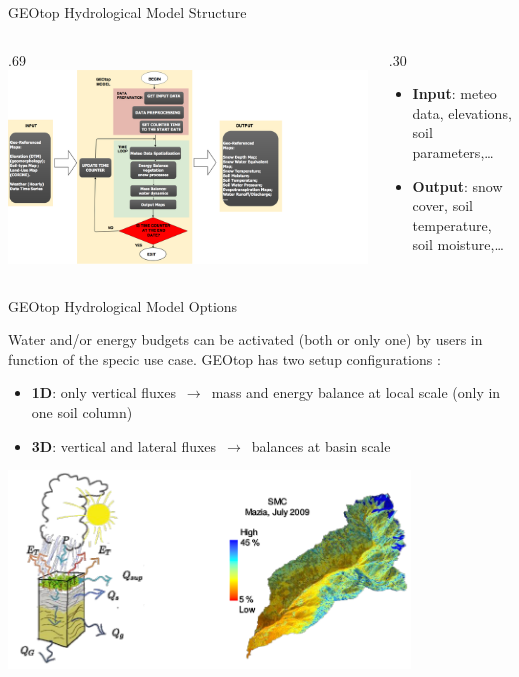 \documentclass[ignorenonframetext,]{beamer}
\def\begincols{\begin{columns}}
\def\begincol{\begin{column}}
\def\endcol{\end{column}}
\def\endcols{\end{columns}}
\begin{document}
\begin{frame}{GEOtop Hydrological Model Structure}

\begincols

\begincol{.69\textwidth}
\includegraphics[width=1.00000\textwidth]{resources/images/geotop_revised.png}\\
\endcol

\begincol{.30\textwidth}

\begin{itemize}
\item
  \textbf{Input}: meteo data, elevations, soil parameters,\ldots{}
\item
  \textbf{Output}: snow cover, soil temperature, soil moisture,\ldots{}
\end{itemize}

\endcol
\endcols

\end{frame}

\begin{frame}{GEOtop Hydrological Model Options}

Water and/or energy budgets can be activated (both or only one) by users
in function of the specic use case. GEOtop has two setup configurations
:

\begin{itemize}
\item
  \textbf{1D}: only vertical fluxes \(\,\to\,\) mass and energy balance
  at local scale (only in one soil column)
\item
  \textbf{3D}: vertical and lateral fluxes \(\,\to\,\) balances at basin
  scale
\end{itemize}

\includegraphics[width=0.80000\textwidth]{resources/images/geotop_ET_SWC.png}\\

\end{frame}
\end{document}
